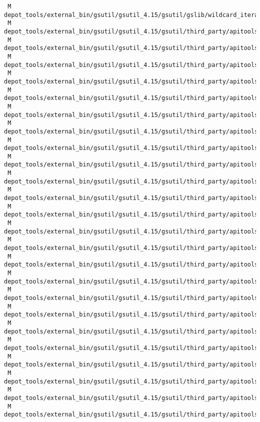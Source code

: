 \documentclass{article}
\begin{document}
\begin{verbatim}
 M depot_tools/external_bin/gsutil/gsutil_4.15/gsutil/gslib/wildcard_iterator.py
 M depot_tools/external_bin/gsutil/gsutil_4.15/gsutil/third_party/apitools/apitools/base/py/app2.py
 M depot_tools/external_bin/gsutil/gsutil_4.15/gsutil/third_party/apitools/apitools/base/py/base_api.py
 M depot_tools/external_bin/gsutil/gsutil_4.15/gsutil/third_party/apitools/apitools/base/py/base_cli.py
 M depot_tools/external_bin/gsutil/gsutil_4.15/gsutil/third_party/apitools/apitools/base/py/batch.py
 M depot_tools/external_bin/gsutil/gsutil_4.15/gsutil/third_party/apitools/apitools/base/py/credentials_lib.py
 M depot_tools/external_bin/gsutil/gsutil_4.15/gsutil/third_party/apitools/apitools/base/py/encoding.py
 M depot_tools/external_bin/gsutil/gsutil_4.15/gsutil/third_party/apitools/apitools/base/py/extra_types.py
 M depot_tools/external_bin/gsutil/gsutil_4.15/gsutil/third_party/apitools/apitools/base/py/http_wrapper.py
 M depot_tools/external_bin/gsutil/gsutil_4.15/gsutil/third_party/apitools/apitools/base/py/stream_slice.py
 M depot_tools/external_bin/gsutil/gsutil_4.15/gsutil/third_party/apitools/apitools/base/py/testing/mock.py
 M depot_tools/external_bin/gsutil/gsutil_4.15/gsutil/third_party/apitools/apitools/base/py/testing/testclient/fusiontables_v1_client.py
 M depot_tools/external_bin/gsutil/gsutil_4.15/gsutil/third_party/apitools/apitools/base/py/testing/testclient/fusiontables_v1_messages.py
 M depot_tools/external_bin/gsutil/gsutil_4.15/gsutil/third_party/apitools/apitools/base/py/transfer.py
 M depot_tools/external_bin/gsutil/gsutil_4.15/gsutil/third_party/apitools/apitools/base/py/transfer_test.py
 M depot_tools/external_bin/gsutil/gsutil_4.15/gsutil/third_party/apitools/apitools/base/py/util.py
 M depot_tools/external_bin/gsutil/gsutil_4.15/gsutil/third_party/apitools/apitools/base/py/util_test.py
 M depot_tools/external_bin/gsutil/gsutil_4.15/gsutil/third_party/apitools/apitools/gen/gen_client_lib.py
 M depot_tools/external_bin/gsutil/gsutil_4.15/gsutil/third_party/apitools/apitools/gen/message_registry.py
 M depot_tools/external_bin/gsutil/gsutil_4.15/gsutil/third_party/apitools/apitools/gen/service_registry.py
 M depot_tools/external_bin/gsutil/gsutil_4.15/gsutil/third_party/apitools/apitools/gen/util.py
 M depot_tools/external_bin/gsutil/gsutil_4.15/gsutil/third_party/apitools/apitools/scripts/oauth2l.py
 M depot_tools/external_bin/gsutil/gsutil_4.15/gsutil/third_party/apitools/apitools/scripts/oauth2l_test.py
 M depot_tools/external_bin/gsutil/gsutil_4.15/gsutil/third_party/apitools/ez_setup.py
 M depot_tools/external_bin/gsutil/gsutil_4.15/gsutil/third_party/apitools/run_pylint.py

\end{verbatim}
\end{document}
